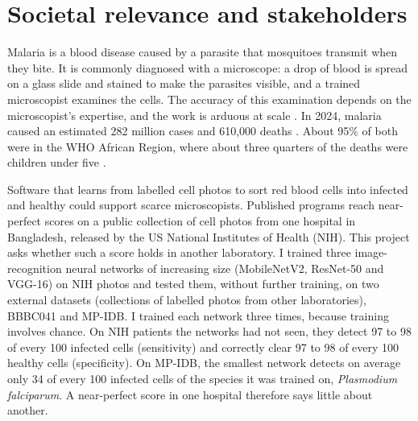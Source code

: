 \documentclass[11pt,a4paper]{article}
\newcommand{\myName}{Noah Tjon Sien Kie}
\newlength{\bodytitleskip}\setlength{\bodytitleskip}{23.1pt}
\newlength{\bodygapA}\setlength{\bodygapA}{31.4pt}
\newlength{\bodygapB}\setlength{\bodygapB}{13.6pt}
\begin{document}
\clearpage
\pagestyle{scrheadings}
\rofoot[{\small\thepage}]{}
\setcounter{page}{1}
\thispagestyle{plain}

\begin{center}
  \vspace*{\bodytitleskip}
  {\LARGE\rmfamily\normalfont{}\par}
  \vspace{\bodygapA}
  {\normalsize\spacedlowsmallcaps{\myName}\par}
  \vspace{\bodygapB}
\end{center}

\section{Societal relevance and stakeholders}

Malaria is a blood disease caused by a parasite that mosquitoes transmit when they bite. It is commonly diagnosed with a microscope: a drop of blood is spread on a glass slide and stained to make the parasites visible, and a trained microscopist examines the cells. The accuracy of this examination depends on the microscopist's expertise, and the work is arduous at scale \citep{rajaraman2018}. In 2024, malaria caused an estimated 282 million cases and 610,000 deaths \citep{who2025}. About 95\% of both were in the WHO African Region, where about three quarters of the deaths were children under five \citep{whomalaria}.

Software that learns from labelled cell photos to sort red blood cells into infected and healthy could support scarce microscopists. Published programs reach near-perfect scores \citep{rajaraman2018} on a public collection of cell photos from one hospital in Bangladesh, released by the US National Institutes of Health (NIH). This project asks whether such a score holds in another laboratory. I trained three image-recognition neural networks of increasing size (\mbox{MobileNetV2}, ResNet-50 and VGG-16) on NIH photos and tested them, without further training, on two external datasets (collections of labelled photos from other laboratories), BBBC041 and MP-IDB. I trained each network three times, because training involves chance. On NIH patients the networks had not seen, they detect 97 to 98 of every 100 infected cells (sensitivity) and correctly clear 97 to 98 of every 100 healthy cells (specificity). On MP-IDB, the smallest network detects on average only 34 of every 100 infected cells of the species it was trained on, \emph{Plasmodium falciparum}. A near-perfect score in one hospital therefore says little about another.
\end{document}
